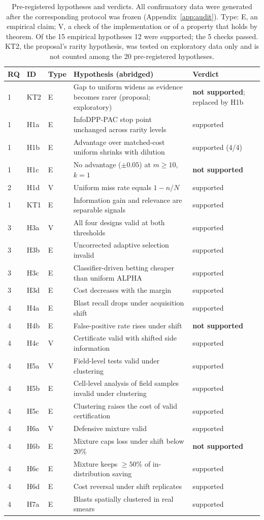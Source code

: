 \documentclass[11pt]{article}
\theoremstyle{remark}
\theoremstyle{definition}
\begin{document}
\begin{table}[t]
\centering\small
\caption{Pre-registered hypotheses and verdicts. All confirmatory data were generated after the corresponding protocol was frozen (Appendix~\ref{app:audit}). Type: E, an empirical claim; V, a check of the implementation or of a property that holds by theorem. Of the 15 empirical hypotheses 12 were supported; the 5 checks passed. KT2, the proposal's rarity hypothesis, was tested on exploratory data only and is not counted among the 20 pre-registered hypotheses.}\label{tab:hyp}
\begin{tabular}{@{}lllp{7.6cm}l@{}}
\toprule
RQ & ID & Type & Hypothesis (abridged) & Verdict\\
\midrule
1 & KT2 & E & Gap to uniform widens as evidence becomes rarer (proposal; exploratory) & \textbf{not supported}; replaced by H1b\\
1 & H1a & E & InfoDPP-PAC stop point unchanged across rarity levels & supported\\
1 & H1b & E & Advantage over matched-cost uniform shrinks with dilution & supported (4/4)\\
1 & H1c & E & No advantage ($\pm0.05$) at $m\ge10$, $k=1$ & \textbf{not supported}\\
2 & H1d & V & Uniform miss rate equals $1-n/N$ & supported\\
1 & KT1 & E & Information gain and relevance are separable signals & supported\\
3 & H3a & V & All four designs valid at both thresholds & supported\\
3 & H3b & E & Uncorrected adaptive selection invalid & supported\\
3 & H3c & E & Classifier-driven betting cheaper than uniform ALPHA & supported\\
3 & H3d & E & Cost decreases with the margin & supported\\
4 & H4a & E & Blast recall drops under acquisition shift & supported\\
4 & H4b & E & False-positive rate rises under shift & \textbf{not supported}\\
4 & H4c & V & Certificate valid with shifted side information & supported\\
4 & H5a & V & Field-level tests valid under clustering & supported\\
4 & H5b & E & Cell-level analysis of field samples invalid under clustering & supported\\
4 & H5c & E & Clustering raises the cost of valid certification & supported\\
4 & H6a & V & Defensive mixture valid & supported\\
4 & H6b & E & Mixture caps loss under shift below 20\% & \textbf{not supported}\\
4 & H6c & E & Mixture keeps $\ge50\%$ of in-distribution saving & supported\\
4 & H6d & E & Cost reversal under shift replicates & supported\\
4 & H7a & E & Blasts spatially clustered in real smears & supported\\
\bottomrule
\end{tabular}
\end{table}
\end{document}
